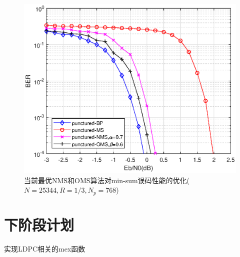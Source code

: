 \documentclass{article}
\begin{document}
\begin{figure}[H]
	\centering
	\includegraphics[width = .75\textwidth]{noms.eps}
	\caption{当前最优NMS和OMS算法对min-sum误码性能的优化($N=25344,R=1/3,N_p=768$)}
\end{figure}




\section{下阶段计划}
实现LDPC相关的mex函数
\end{document}
